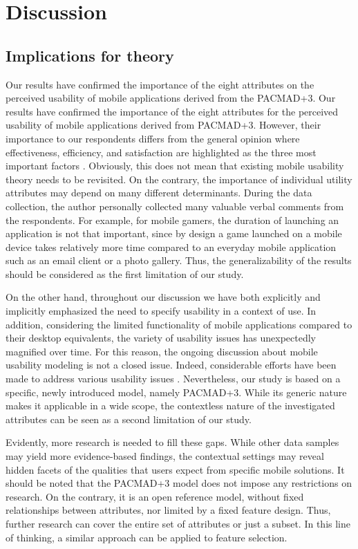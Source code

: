 \documentclass[preprint,12pt]{elsarticle}
\begin{document}
\section{Discussion}
\subsection{Implications for theory}
Our results have confirmed the importance of the eight attributes on the perceived usability of mobile applications derived from the PACMAD+3. Our results have confirmed the importance of the eight attributes for the perceived usability of mobile applications derived from PACMAD+3. However, their importance to our respondents differs from the general opinion where effectiveness, efficiency, and satisfaction are highlighted as the three most important factors \cite{johnson2020usability}. Obviously, this does not mean that existing mobile usability theory needs to be revisited. On the contrary, the importance of individual utility attributes may depend on many different determinants. During the data collection, the author personally collected many valuable verbal comments from the respondents. For example, for mobile gamers, the duration of launching an application is not that important, since by design a game launched on a mobile device takes relatively more time compared to an everyday mobile application such as an email client or a photo gallery. Thus, the generalizability of the results should be considered as the first limitation of our study. 

On the other hand, throughout our discussion we have both explicitly and implicitly emphasized the need to specify usability in a context of use. In addition, considering the limited functionality of mobile applications compared to their desktop equivalents, the variety of usability issues has unexpectedly magnified \cite{vasa2012preliminary, genc2017systematic, alqahtani2020insights} over time. For this reason, the ongoing discussion about mobile usability modeling is not a closed issue.  Indeed, considerable efforts have been made to address various usability issues \cite{heo2009framework, hensher2021scoping, schlichtig2024building}. Nevertheless, our study is based on a specific, newly introduced model, namely PACMAD+3.  While its generic nature makes it applicable in a wide scope, the contextless nature of the investigated attributes can be seen as a second limitation of our study. 

Evidently, more research is needed to fill these gaps. While other data samples may yield more evidence-based findings, the contextual settings may reveal hidden facets of the qualities that users expect from specific mobile solutions. It should be noted that the PACMAD+3 model does not impose any restrictions on research. On the contrary, it is an open reference model, without fixed relationships between attributes, nor limited by a fixed feature design. Thus, further research can cover the entire set of attributes or just a subset. In this line of thinking, a similar approach can be applied to feature selection.
\end{document}
